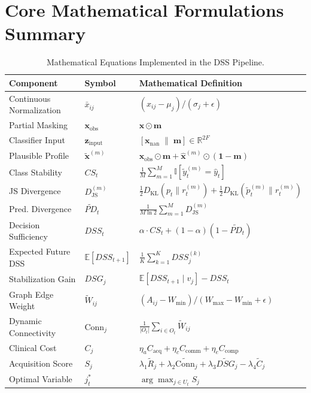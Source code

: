 \documentclass[11pt,a4paper]{report}
\begin{document}
\chapter{Core Mathematical Formulations Summary}
\begin{table}[htbp]
  \centering
  \small
  \caption{Mathematical Equations Implemented in the DSS Pipeline.}
  \label{tab:math_summary}
  \begin{tabularx}{\textwidth}{llX}
    \toprule
    \textbf{Component} & \textbf{Symbol} & \textbf{Mathematical Definition} \\
    \midrule
    Continuous Normalization & $\bar{x}_{ij}$ & $(x_{ij} - \mu_j) / (\sigma_j + \epsilon)$ \\
    Partial Masking & $\mathbf{x}_{\text{obs}}$ & $\mathbf{x} \odot \mathbf{m}$ \\
    Classifier Input & $\mathbf{z}_{\text{input}}$ & $[\mathbf{x}_{\text{nan}} \;\parallel\; \mathbf{m}] \in \mathbb{R}^{2F}$ \\
    Plausible Profile & $\tilde{\mathbf{x}}^{(m)}$ & $\mathbf{x}_{\text{obs}} \odot \mathbf{m} + \hat{\mathbf{x}}^{(m)} \odot (\mathbf{1} - \mathbf{m})$ \\
    Class Stability & $CS_t$ & $\frac{1}{M}\sum_{m=1}^M \mathbb{I}[\tilde{y}_t^{(m)} = \hat{y}_t]$ \\
    JS Divergence & $D_{\text{JS}}^{(m)}$ & $\frac{1}{2} D_{\text{KL}}(p_t \parallel r_t^{(m)}) + \frac{1}{2} D_{\text{KL}}(\tilde{p}_t^{(m)} \parallel r_t^{(m)})$ \\
    Pred. Divergence & $\widetilde{PD}_t$ & $\frac{1}{M \ln 2}\sum_{m=1}^M D_{\text{JS}}^{(m)}$ \\
    Decision Sufficiency & $DSS_t$ & $\alpha \cdot CS_t + (1 - \alpha)(1 - \widetilde{PD}_t)$ \\
    Expected Future DSS & $\mathbb{E}[DSS_{t+1}]$ & $\frac{1}{K}\sum_{k=1}^K DSS_j^{(k)}$ \\
    Stabilization Gain & $DSG_j$ & $\mathbb{E}[DSS_{t+1} \mid v_j] - DSS_t$ \\
    Graph Edge Weight & $\widetilde{W}_{ij}$ & $(A_{ij} - W_{\min}) / (W_{\max} - W_{\min} + \epsilon)$ \\
    Dynamic Connectivity & $\text{Conn}_j$ & $\frac{1}{|O_t|}\sum_{i \in O_t} \widetilde{W}_{ij}$ \\
    Clinical Cost & $C_j$ & $\eta_a C_{\text{acq}} + \eta_c C_{\text{comm}} + \eta_e C_{\text{comp}}$ \\
    Acquisition Score & $S_j$ & $\lambda_1 \widetilde{R}_j + \lambda_2 \widetilde{\text{Conn}}_j + \lambda_3 \widetilde{DSG}_j - \lambda_4 \widetilde{C}_j$ \\
    Optimal Variable & $j^*_t$ & $\arg\max_{j \in U_t} S_j$ \\
    \bottomrule
  \end{tabularx}
\end{table}
\end{document}
